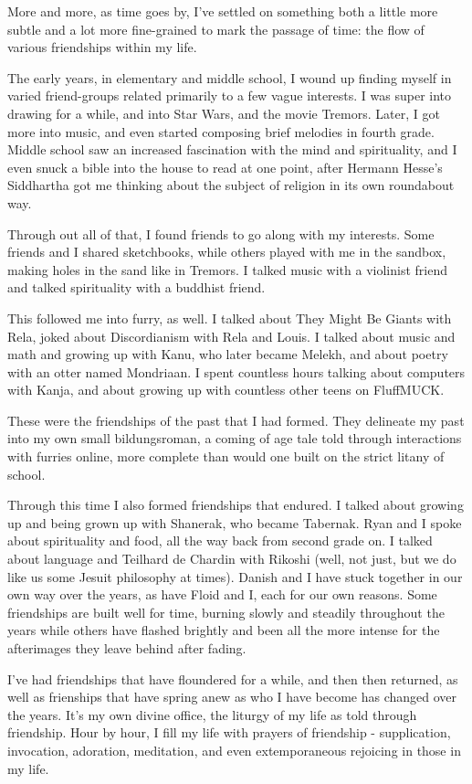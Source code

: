 More and more, as time goes by, I've settled on something both a little more subtle and a lot more fine-grained to mark the passage of time: the flow of various friendships within my life.

The early years, in elementary and middle school, I wound up finding myself in varied friend-groups related primarily to a few vague interests. I was super into drawing for a while, and into Star Wars, and the movie Tremors. Later, I got more into music, and even started composing brief melodies in fourth grade. Middle school saw an increased fascination with the mind and spirituality, and I even snuck a bible into the house to read at one point, after Hermann Hesse's Siddhartha got me thinking about the subject of religion in its own roundabout way.

Through out all of that, I found friends to go along with my interests. Some friends and I shared sketchbooks, while others played with me in the sandbox, making holes in the sand like in Tremors. I talked music with a violinist friend and talked spirituality with a buddhist friend.

This followed me into furry, as well. I talked about They Might Be Giants with Rela, joked about Discordianism with Rela and Louis. I talked about music and math and growing up with Kanu, who later became Melekh, and about poetry with an otter named Mondriaan. I spent countless hours talking about computers with Kanja, and about growing up with countless other teens on FluffMUCK.

These were the friendships of the past that I had formed. They delineate my past into my own small bildungsroman, a coming of age tale told through interactions with furries online, more complete than would one built on the strict litany of school.

Through this time I also formed friendships that endured. I talked about growing up and being grown up with Shanerak, who became Tabernak. Ryan and I spoke about spirituality and food, all the way back from second grade on. I talked about language and Teilhard de Chardin with Rikoshi (well, not just, but we do like us some Jesuit philosophy at times). Danish and I have stuck together in our own way over the years, as have Floid and I, each for our own reasons. Some friendships are built well for time, burning slowly and steadily throughout the years while others have flashed brightly and been all the more intense for the afterimages they leave behind after fading.

I've had friendships that have floundered for a while, and then then returned, as well as frienships that have spring anew as who I have become has changed over the years. It's my own divine office, the liturgy of my life as told through friendship. Hour by hour, I fill my life with prayers of friendship - supplication, invocation, adoration, meditation, and even extemporaneous rejoicing in those in my life.

